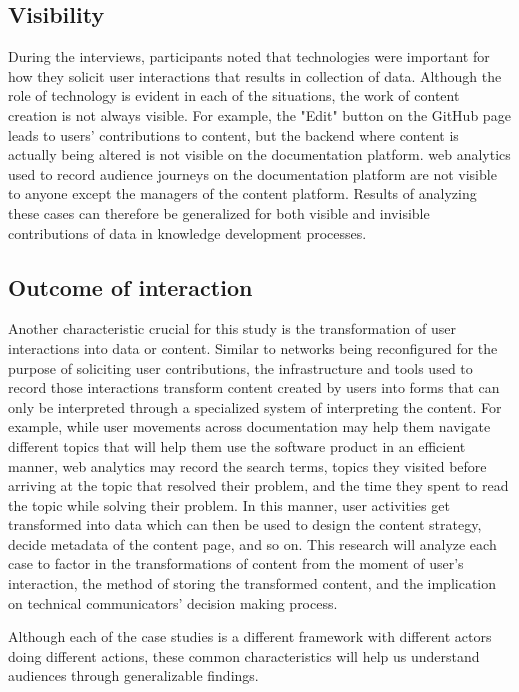 \subsection{Visibility}
During the interviews, participants noted that technologies were important for how they solicit user interactions that results in collection of data. Although the role of technology is evident in each of the situations, the work of content creation is not always visible. For example, the "Edit" button on the GitHub page leads to users' contributions to content, but the backend where content is actually being altered is not visible on the documentation platform. web analytics used to record audience journeys on the documentation platform are not visible to anyone except the managers of the content platform. Results of analyzing these cases can therefore be generalized for both visible and invisible contributions of data in knowledge development processes.

\subsection{Outcome of interaction}
Another characteristic crucial for this study is the transformation of user interactions into data or content. Similar to networks being reconfigured for the purpose of soliciting user contributions, the infrastructure and tools used to record those interactions transform content created by users into forms that can only be interpreted through a specialized system of interpreting the content. For example, while user movements across documentation may help them navigate different topics that will help them use the software product in an efficient manner, web analytics may record the search terms, topics they visited before arriving at the topic that resolved their problem, and the time they spent to read the topic while solving their problem. In this manner, user activities get transformed into data which can then be used to design the content strategy, decide metadata of the content page, and so on. This research will analyze each case to factor in the transformations of content from the moment of user's interaction, the method of storing the transformed content, and the implication on technical communicators' decision making process.

Although each of the case studies is a different framework with different actors doing different actions, these common characteristics will help us understand audiences through generalizable findings.

